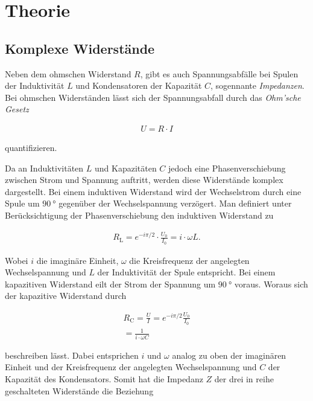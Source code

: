 \section{Theorie}
\label{sec:Theorie}

\subsection{Komplexe Widerstände}

Neben dem ohmschen Widerstand $R$, gibt es auch Spannungsabfälle bei Spulen der Induktivität $L$ und Kondensatoren der Kapazität $C$, 
sogennante \textit{Impedanzen}. Bei ohmschen Widerständen lässt sich der Spannungsabfall durch das \textit{Ohm'sche Gesetz} 

\begin{align*}
    U = R \cdot I    
\end{align*}

quantifizieren.

Da an Induktivitäten $L$ und Kapazitäten $C$ jedoch eine Phasenverschiebung zwischen Strom und Spannung auftritt, werden diese Widerstände
komplex dargestellt. Bei einem induktiven Widerstand wird der Wechselstrom durch eine Spule um $\SI{90}{\degree}$ gegenüber der 
Wechselspannung verzögert. Man definiert unter Berücksichtigung der Phasenverschiebung den induktiven Widerstand zu

\begin{align*}
    R_{\text{L}} = e^{-i\pi/2}\cdot\frac{U_0}{I_0} = i\cdot\omega L.
\end{align*}

Wobei $i$ die imaginäre Einheit, $\omega$ die Kreisfrequenz der angelegten Wechselspannung und $L$ der Induktivität der Spule entspricht.
Bei einem kapazitiven Widerstand eilt der Strom der Spannung um $\SI{90}{\degree}$ voraus. Woraus sich der kapazitive Widerstand durch

\begin{align*}
    R_{\text{C}} = \frac UI = e^{-i\pi/2} \frac{U_0}{I_0} \\
    = \frac{1}{i\cdot\omega C}
\end{align*}

beschreiben lässt. Dabei entsprichen $i$ und $\omega$ analog zu oben der imaginären Einheit und der Kreisfrequenz der angelegten 
Wechselspannung und $C$ der Kapazität des Kondensators.
Somit hat die Impedanz $Z$ der drei in reihe geschalteten Widerstände die Beziehung

